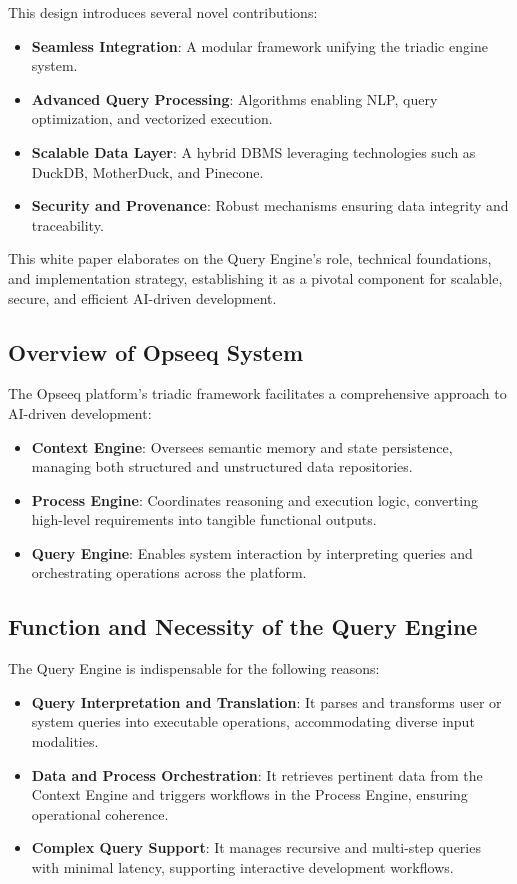 \documentclass[11pt]{article}
\begin{document}
This design introduces several novel contributions:
\begin{itemize}
    \item \textbf{Seamless Integration}: A modular framework unifying the triadic engine system.
    \item \textbf{Advanced Query Processing}: Algorithms enabling NLP, query optimization, and vectorized execution.
    \item \textbf{Scalable Data Layer}: A hybrid DBMS leveraging technologies such as DuckDB, MotherDuck, and Pinecone.
    \item \textbf{Security and Provenance}: Robust mechanisms ensuring data integrity and traceability.
\end{itemize}

This white paper elaborates on the Query Engine’s role, technical foundations, and implementation strategy, establishing it as a pivotal component for scalable, secure, and efficient AI-driven development.

\subsection{Overview of Opseeq System}
The Opseeq platform’s triadic framework facilitates a comprehensive approach to AI-driven development:
\begin{itemize}
    \item \textbf{Context Engine}: Oversees semantic memory and state persistence, managing both structured and unstructured data repositories.
    \item \textbf{Process Engine}: Coordinates reasoning and execution logic, converting high-level requirements into tangible functional outputs.
    \item \textbf{Query Engine}: Enables system interaction by interpreting queries and orchestrating operations across the platform.
\end{itemize}

\subsection{Function and Necessity of the Query Engine}
The Query Engine is indispensable for the following reasons:
\begin{itemize}
    \item \textbf{Query Interpretation and Translation}: It parses and transforms user or system queries into executable operations, accommodating diverse input modalities.
    \item \textbf{Data and Process Orchestration}: It retrieves pertinent data from the Context Engine and triggers workflows in the Process Engine, ensuring operational coherence.
    \item \textbf{Complex Query Support}: It manages recursive and multi-step queries with minimal latency, supporting interactive development workflows.
\end{itemize}
\end{document}
